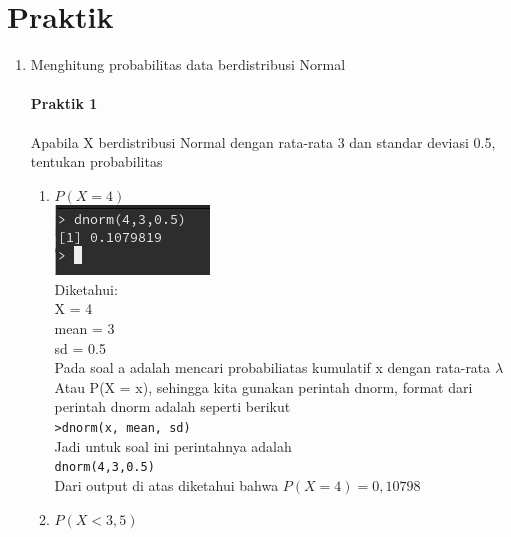 \documentclass[a4paper,12pt]{article}
\begin{document}
\section{Praktik}
\begin{enumerate}[label=\textbf{\Alph*.}]
	\item Menghitung probabilitas  data berdistribusi Normal
	\paragraph{Praktik 1\\}
Apabila X berdistribusi Normal dengan rata-rata 3 dan standar deviasi 0.5, tentukan probabilitas

\begin{enumerate}[label=\alph*.]
  \item $P(X = 4)$\\
  \includegraphics[scale=1]{praka1a}\\
  Diketahui:\\
  X = 4\\
  mean = 3\\
  sd = 0.5\\
  Pada soal a adalah mencari probabiliatas kumulatif x dengan rata-rata $\lambda$
  Atau P(X = x), sehingga kita gunakan perintah dnorm, format dari perintah dnorm adalah seperti berikut\\
  \texttt{>dnorm(x, mean, sd)\\}
  Jadi untuk soal ini perintahnya adalah\\
  \texttt{dnorm(4,3,0.5)}\\
  Dari output di atas diketahui bahwa $P(X = 4) = 0,10798$
  \item $P (X < 3,5)$
\end{enumerate}

\end{enumerate}
\end{document}
